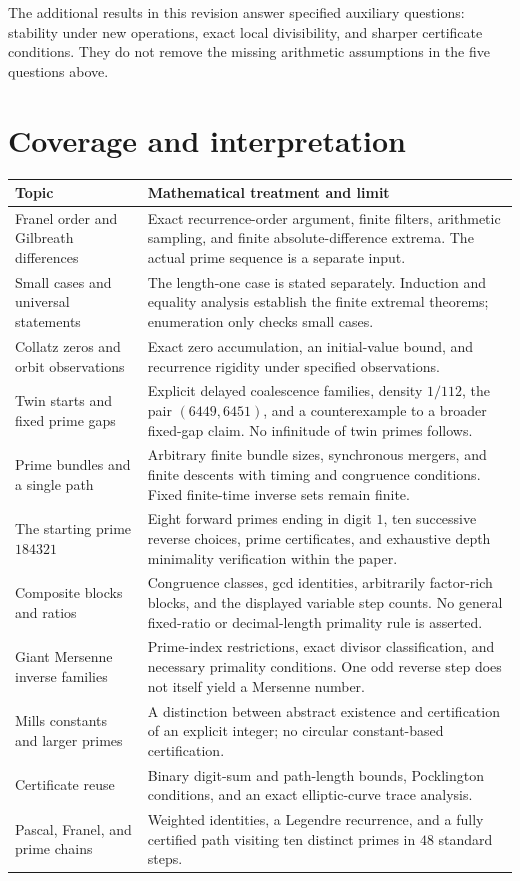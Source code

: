 \documentclass[11pt,a4paper]{article}
\theoremstyle{definition}
\theoremstyle{remark}
\numberwithin{equation}{section}
\begin{document}
The additional results in this revision answer specified auxiliary questions:
stability under new operations, exact local divisibility, and sharper
certificate conditions. They do not remove the missing arithmetic assumptions
in the five questions above.

\section{Coverage and interpretation}
\begin{longtable}{p{}p{}}
\toprule
Topic & Mathematical treatment and limit\\\midrule\endhead
Franel order and Gilbreath differences & Exact recurrence-order argument,
finite filters, arithmetic sampling, and finite absolute-difference extrema.
The actual prime sequence is a separate input.\\
Small cases and universal statements & The length-one case is stated
separately. Induction and equality analysis establish the finite extremal
theorems; enumeration only checks small cases.\\
Collatz zeros and orbit observations & Exact zero accumulation, an
initial-value bound, and recurrence rigidity under specified observations.\\
Twin starts and fixed prime gaps & Explicit delayed coalescence families,
density $1/112$, the pair $(6449,6451)$, and a counterexample to a broader
fixed-gap claim. No infinitude of twin primes follows.\\
Prime bundles and a single path & Arbitrary finite bundle sizes,
synchronous mergers, and finite descents with timing and congruence conditions.
Fixed finite-time inverse sets remain finite.\\
The starting prime $184321$ & Eight forward primes ending in digit $1$,
ten successive reverse choices, prime certificates, and exhaustive depth
minimality verification within the paper.\\
Composite blocks and ratios & Congruence classes, gcd identities, arbitrarily
factor-rich blocks, and the displayed variable step counts. No general
fixed-ratio or decimal-length primality rule is asserted.\\
Giant Mersenne inverse families & Prime-index restrictions, exact divisor
classification, and necessary primality conditions. One odd reverse step
does not itself yield a Mersenne number.\\
Mills constants and larger primes & A distinction between abstract
existence and certification of an explicit integer; no circular
constant-based certification.\\
Certificate reuse & Binary digit-sum and path-length bounds,
Pocklington conditions, and an exact elliptic-curve trace analysis.\\
Pascal, Franel, and prime chains & Weighted identities, a Legendre recurrence,
and a fully certified path visiting ten distinct primes in $48$ standard steps.\\
\bottomrule
\end{longtable}
\end{document}
